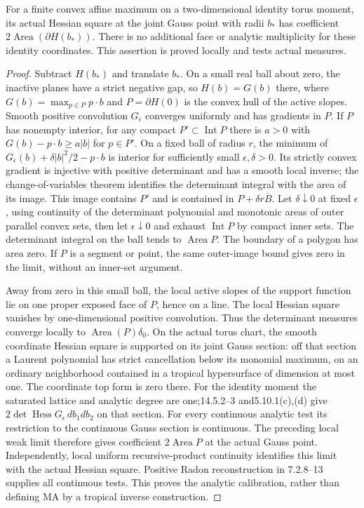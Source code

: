 \begin{lemma}\label{branch:area}
For a finite convex affine maximum on a two-dimensional identity torus
moment, its actual Hessian square at the joint Gauss point with radii
$b_*$ has coefficient $2\operatorname{Area}(\partial H(b_*))$.
There is no additional face or analytic multiplicity for these identity
coordinates. This assertion is proved locally and tests actual measures.
\end{lemma}
\begin{proof}
Subtract $H(b_*)$ and translate $b_*$. On a small real ball about zero,
the inactive planes have a strict negative gap, so $H(b)=G(b)$ there,
where $G(b)=\max_{p\in P}p\cdot b$ and $P=\partial H(0)$ is the convex
hull of the active slopes. Smooth positive convolution $G_\epsilon$
converges uniformly and has gradients in $P$. If $P$ has nonempty interior,
for any compact $P'\subset\operatorname{Int}P$ there is $a>0$ with
$G(b)-p\cdot b\ge a|b|$ for $p\in P'$. On a fixed ball of radius $r$,
the minimum of $G_\epsilon(b)+\delta|b|^2/2-p\cdot b$ is interior for
sufficiently small $\epsilon,\delta>0$. Its strictly convex gradient is
injective with positive determinant and has a smooth local inverse;
the change-of-variables theorem identifies the determinant integral with
the area of its image. This image contains $P'$ and is contained in
$P+\delta r\overline B$. Let $\delta\downarrow0$ at fixed $\epsilon$,
using continuity of the determinant polynomial and monotonic areas of
outer parallel convex sets, then let $\epsilon\downarrow0$ and exhaust
$\operatorname{Int}P$ by compact inner sets. The determinant integral on
the ball tends to $\operatorname{Area}P$. The boundary of a polygon has
area zero. If $P$ is a segment or point, the same outer-image bound gives
zero in the limit, without an inner-set argument.

Away from zero in this small ball, the local active slopes of the support
function lie on one proper exposed face of $P$, hence on a line. The
local Hessian square vanishes by one-dimensional positive convolution.
Thus the determinant measures converge locally to
$\operatorname{Area}(P)\delta_0$.
On the actual torus chart, the smooth coordinate Hessian square is
supported on its joint Gauss section: off that section a Laurent polynomial
has strict cancellation below its monomial maximum, on an ordinary
neighborhood contained in a tropical hypersurface of dimension at most
one. The coordinate top form is zero there. For the identity moment the
saturated lattice and analytic degree are one;14.5.2--3 and5.10.1(c),(d)
give $2\det\operatorname{Hess}G_\epsilon\,db_1db_2$ on that section.
For every continuous analytic test its restriction to the continuous
Gauss section is continuous. The preceding local weak limit therefore
gives coefficient $2\operatorname{Area}P$ at the actual Gauss point.
Independently, local uniform recursive-product continuity identifies this
limit with the actual Hessian square. Positive Radon reconstruction in
7.2.8--13 supplies all continuous tests. This proves the analytic
calibration, rather than defining MA by a tropical inverse construction.
\end{proof}

